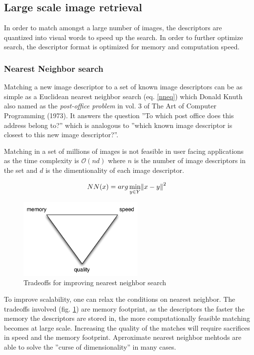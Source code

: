 \documentclass[english,12pt,a4paper,pdftex,elec,utf8]{aaltothesis}
\begin{document}
\subsection{Large scale image retrieval}

In order to match amongst a large number of images, the descriptors are quantized into visual words to speed up the search. In order to further optimize search, the descriptor format is optimized for memory and computation speed. \cite{Jegou2010}

\subsubsection{Nearest Neighbor search}
Matching a new image descriptor to a set of known image descriptors can be as simple as a Euclidean nearest neighbor search (eq. \ref{nneq}) which Donald Knuth also named as the \emph{post-office problem} in vol. 3 of The Art of Computer Programming (1973). It answers the question ''To which post office does this address belong to?'' which is analogous to ''which known image descriptor is closest to this new image descriptor?''.

Matching in a set of millions of images is not feasible in user facing applications as the time complexity is $\mathcal{O}(nd)$ where $n$ is the number of image descriptors in the set and $d$ is the dimentionality of each image descriptor.


\begin{equation}
\label{nneq}
NN(x) = arg \min_{y\in Y}\norm{x-y}^2
\end{equation}

\begin{figure}[htb]
\begin{center}
\includegraphics[height=4cm]{figures/nntradeoffs}
\end{center}
\caption{Tradeoffs for improving nearest neighbor search}
\label{nntradeoffs}
\end{figure}

To improve scalability, one can relax the conditions on nearest neighbor. The tradeoffs involved (fig. \ref{nntradeoffs}) are memory footprint, as the descriptors the faster the memory the descriptors are stored in, the more computationally feasible matching becomes at large scale. Increasing the quality of the matches will require sacrifices in speed and the memory footprint. Aprroximate nearest neighbor mehtods are able to solve the ''curse of dimensionality'' in many cases.
\end{document}
